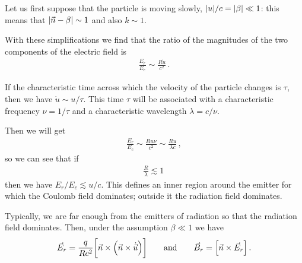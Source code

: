 \documentclass[main.tex]{subfiles}
\begin{document}
Let us first suppose that the particle is moving slowly, \(\abs{u}/ c = \abs{\beta } \ll 1 \): this means that \(\abs{\vec{n} - \beta } \sim 1\) and also \(k \sim 1\). 

With these simplifications we find that the ratio of the magnitudes of the two components of the electric field is  
%
\begin{align}
\frac{E_r}{E_c} \sim \frac{R \dot{u}}{c^2}
\,.
\end{align}

If the characteristic time across which the velocity of the particle changes is \(\tau \), then we have \(\dot{u} \sim u / \tau\). 
This time \(\tau \) will be associated with a characteristic frequency \(\nu = 1 / \tau \) and a characteristic wavelength \(\lambda = c / \nu \). 

Then we will get 
%
\begin{align}
\frac{E_r}{E_c} \sim \frac{R u \nu }{c^2} \sim \frac{R u}{\lambda c}
\,,
\end{align}
%
so we can see that if 
%
\begin{align}
\frac{R}{\lambda } \lesssim 1
\,
\end{align}
%
then we have \(E_r / E_c \lesssim u /c\). This defines an inner region around the emitter for which the Coulomb field dominates; outside it the radiation field dominates. 

Typically, we are far enough from the emitters of radiation so that the radiation field dominates. 
Then, under the assumption \(\beta \ll 1\) we have  
%
\begin{align}
\vec{E}_r = \frac{q}{Rc^2} \qty[\vec{n} \times \qty(\vec{n} \times \dot{\vec{u}})]
\qquad \text{and} \qquad
\vec{B}_r = \qty[\vec{n} \times \vec{E}_r]
\,.
\end{align}
\end{document}
